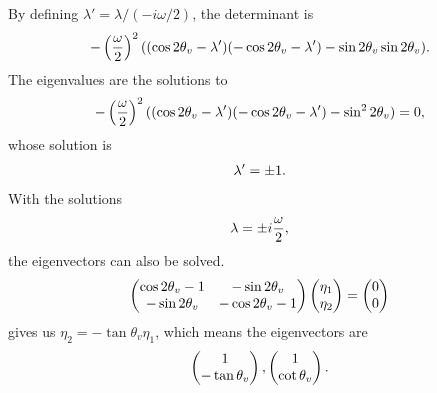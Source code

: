 \documentclass[letterpaper,12pt,english]{sphinxmanual}
\begin{document}
By defining \(\lambda' = \lambda/(-i \omega / 2)\), the determinant is
\begin{gather}
\begin{split}- \left( \frac{\omega}{2} \right)^2   ( (\cos 2\theta_v - \lambda')(-\cos 2\theta_v - \lambda') - \sin 2\theta_v \sin 2\theta_v ) .\end{split}\notag
\end{gather}
The eigenvalues are the solutions to
\begin{gather}
\begin{split}- \left( \frac{\omega}{2} \right)^2   ( (\cos 2\theta_v - \lambda')(-\cos 2\theta_v - \lambda') - \sin^2 2\theta_v  ) =0 ,\end{split}\notag
\end{gather}
whose solution is
\begin{gather}
\begin{split}\lambda' = \pm 1.\end{split}\notag
\end{gather}
With the solutions
\begin{gather}
\begin{split}\lambda = \pm i \frac{\omega}{2},\end{split}\notag
\end{gather}
the eigenvectors can also be solved.
\begin{gather}
\begin{split}\begin{pmatrix}
\cos 2\theta_v - 1 &  -  \sin 2\theta_v \\  - \sin 2\theta_v & - \cos 2\theta_v -1
\end{pmatrix} \begin{pmatrix}
\eta_1 \\ \eta_2
\end{pmatrix} = \begin{pmatrix}
0 \\ 0
\end{pmatrix}\end{split}\notag
\end{gather}
gives us \(\eta_2 = -\tan \theta_v \eta_1\), which means the eigenvectors are
\begin{gather}
\begin{split}\begin{pmatrix}
1  \\ -\tan\theta_v
\end{pmatrix} , \begin{pmatrix}
1 \\ \cot \theta_v
\end{pmatrix}.\end{split}\notag
\end{gather}
\end{document}

